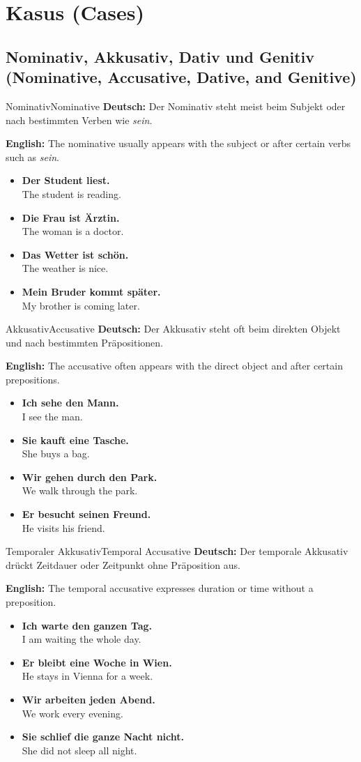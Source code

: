 \documentclass[a4paper,11pt]{article}
\newcommand{\GermanText}[1]{\textbf{Deutsch: }#1\par}
\newcommand{\EnglishText}[1]{{\color{SoftGray}\textbf{English: }#1\par}}
\newcommand{\ExampleItem}[2]{\item \textbf{#1}\\{\color{SoftGray}#2}}
\begin{document}
\section{Kasus {\small (Cases)}}

\subsection{Nominativ, Akkusativ, Dativ und Genitiv {\small (Nominative, Accusative, Dative, and Genitive)}}

\begin{grammarentry}{Nominativ}{Nominative}
    \GermanText{Der Nominativ steht meist beim Subjekt oder nach bestimmten Verben wie \textit{sein}.}
    \EnglishText{The nominative usually appears with the subject or after certain verbs such as \textit{sein}.}
    \begin{exbox}
        \begin{itemize}
            \ExampleItem{Der Student liest.}{The student is reading.}
            \ExampleItem{Die Frau ist Ärztin.}{The woman is a doctor.}
            \ExampleItem{Das Wetter ist schön.}{The weather is nice.}
            \ExampleItem{Mein Bruder kommt später.}{My brother is coming later.}
        \end{itemize}
    \end{exbox}
\end{grammarentry}

\begin{grammarentry}{Akkusativ}{Accusative}
    \GermanText{Der Akkusativ steht oft beim direkten Objekt und nach bestimmten Präpositionen.}
    \EnglishText{The accusative often appears with the direct object and after certain prepositions.}
    \begin{exbox}
        \begin{itemize}
            \ExampleItem{Ich sehe den Mann.}{I see the man.}
            \ExampleItem{Sie kauft eine Tasche.}{She buys a bag.}
            \ExampleItem{Wir gehen durch den Park.}{We walk through the park.}
            \ExampleItem{Er besucht seinen Freund.}{He visits his friend.}
        \end{itemize}
    \end{exbox}
\end{grammarentry}

\begin{grammarentry}{Temporaler Akkusativ}{Temporal Accusative}
    \GermanText{Der temporale Akkusativ drückt Zeitdauer oder Zeitpunkt ohne Präposition aus.}
    \EnglishText{The temporal accusative expresses duration or time without a preposition.}
    \begin{exbox}
        \begin{itemize}
            \ExampleItem{Ich warte den ganzen Tag.}{I am waiting the whole day.}
            \ExampleItem{Er bleibt eine Woche in Wien.}{He stays in Vienna for a week.}
            \ExampleItem{Wir arbeiten jeden Abend.}{We work every evening.}
            \ExampleItem{Sie schlief die ganze Nacht nicht.}{She did not sleep all night.}
        \end{itemize}
    \end{exbox}
\end{grammarentry}
\end{document}
